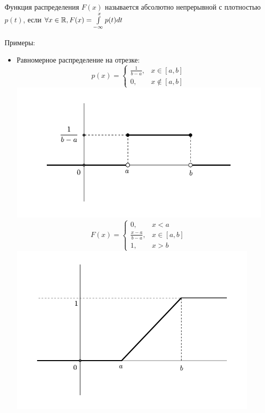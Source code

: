     \begin{definition}
        Функция распределения $F(x)$ называется абсолютно непрерывной с плотностью $p(t)$, если $\forall x
        \in \mathbb{R}, F(x) = \int\limits_{-\infty}^{x} p(t)dt$
    \end{definition}

    Примеры:

    \begin{itemize}
        \item Равномерное распределение на отрезке:
            \[
                p(x) =
                \begin{cases}
                    \frac{1}{b-a}, &x \in [a, b]\\
                    0, &x \not\in [a, b]
                \end{cases}
            \]
            \includegraphics[width=13cm]{main-lectures/images/Lec_8_2.pdf}
            \[
                F(x) =
                \begin{cases}
                    0, &x < a\\
                    \frac{x-a}{b-a}, &x \in [a, b]\\
                    1, &x > b
                \end{cases}
            \]
            \includegraphics[width=12cm]{main-lectures/images/Lec_8_3.pdf}


\end{itemize}
